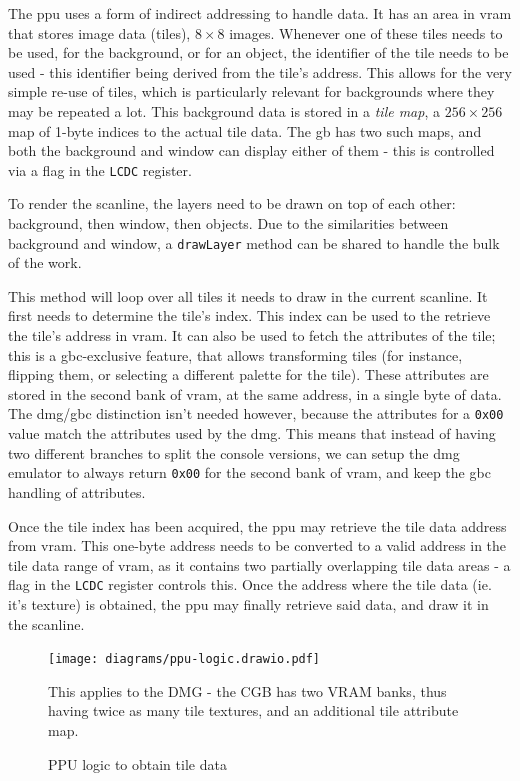 \documentclass[11pt]{report}
\begin{document}
The \gls{ppu} uses a form of indirect addressing to handle data. It has an area in \gls{vram} that stores image data (tiles), $8 \times 8$ images. Whenever one of these tiles needs to be used, for the background, or for an object, the identifier of the tile needs to be used - this identifier being derived from the tile's address. This allows for the very simple re-use of tiles, which is particularly relevant for backgrounds where they may be repeated a lot. This background data is stored in a \textit{tile map}, a $256 \times 256$ map of 1-byte indices to the actual tile data. The \gls{gb} has two such maps, and both the background and window can display either of them - this is controlled via a flag in the \texttt{LCDC} register.

To render the scanline, the layers need to be drawn on top of each other: background, then window, then objects. Due to the similarities between background and window, a \texttt{drawLayer} method can be shared to handle the bulk of the work.

This method will loop over all tiles it needs to draw in the current scanline. It first needs to determine the tile's index. This index can be used to the retrieve the tile's address in \gls{vram}. It can also be used to fetch the attributes of the tile; this is a \gls{gbc}-exclusive feature, that allows transforming tiles (for instance, flipping them, or selecting a different palette for the tile). These attributes are stored in the second bank of \gls{vram}, at the same address, in a single byte of data. The \gls{dmg}/\gls{gbc} distinction isn't needed however, because the attributes for a \texttt{0x00} value match the attributes used by the \gls{dmg}. This means that instead of having two different branches to split the console versions, we can setup the \gls{dmg} emulator to always return \texttt{0x00} for the second bank of \gls{vram}, and keep the \gls{gbc} handling of attributes.

Once the tile index has been acquired, the \gls{ppu} may retrieve the tile data address from \gls{vram}. This one-byte address needs to be converted to a valid address in the tile data range of \gls{vram}, as it contains two partially overlapping tile data areas - a flag in the \texttt{LCDC} register controls this. Once the address where the tile data (ie. it's texture) is obtained, the \gls{ppu} may finally retrieve said data, and draw it in the scanline.

\begin{figure}[h]
    \centering
    \texttt{[image: diagrams/ppu-logic.drawio.pdf]}
    \caption{PPU logic to obtain tile data}
	This applies to the DMG - the CGB has two VRAM banks, thus having twice as many tile textures, and an additional tile attribute map.
    \label{fig:emu-core-components}
\end{figure}
\end{document}
